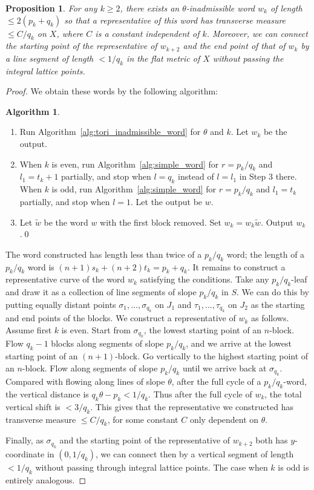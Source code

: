 \documentclass[11pt]{article} %
\theoremstyle{plain}
\newtheorem{prop}[thm]{Proposition}
\theoremstyle{definition}
\newtheorem{alg}[thm]{Algorithm}
\numberwithin{equation}{section}
\begin{document}
\begin{prop}
For any $k\ge2$, there exists an $\theta$-inadmissible word $w_{k}$ of length $\le 2(p_k+q_k)$ so that a representative of this word has transverse measure $\le C/q_{k}$ on $X$, where $C$ is a constant independent of $k$. Moreover, we can connect the starting point of the representative of $w_{k+2}$ and the end point of that of $w_k$ by a line segment of length $<1/q_k$ in the flat metric of $X$ without passing the integral lattice points. 
\end{prop}
\begin{proof}
We obtain these words by the following algorithm:
\begin{alg}\label{alg:tori_segments}
\begin{enumerate}[topsep=0mm, itemsep=0mm]
    \item Run Algorithm~\ref{alg:tori_inadmissible_word} for $\theta$ and $k$. Let $w_k$ be the output.
    \item When $k$ is even, run Algorithm~\ref{alg:simple_word} for $r=p_k/q_k$ and $l_1=t_k+1$ partially, and stop when $l=q_k$ instead of $l=l_1$ in Step 3 there. When $k$ is odd, run Algorithm~\ref{alg:simple_word} for $r=p_k/q_k$ and $l_1=t_k$ partially, and stop when $l=1$. Let the output be $w$.
    \item Let $\tilde w$ be the word $w$ with the first block removed. Set $w_k=w_k\tilde w$. Output $w_k$.\qed
\end{enumerate}
\end{alg}
The word constructed has length less than twice of a $p_k/q_k$ word; the length of a $p_k/q_k$ word is $(n+1)s_k+(n+2)t_k=p_k+q_k$. It remains to construct a representative curve of the word $w_k$ satisfying the conditions. Take any $p_k/q_k$-leaf and draw it as a collection of line segments of slope $p_k/q_k$ in $S$. We can do this by putting equally distant points $\sigma_1,\ldots,\sigma_{q_k}$ on $J_1$ and $\tau_1,\ldots,\tau_{q_k}$ on $J_2$ as the starting and end points of the blocks. We construct a representative of $w_k$ as follows. Assume first $k$ is even. Start from $\sigma_{q_k}$, the lowest starting point of an $n$-block. Flow $q_{k}-1$ blocks along segments of slope $p_k/q_k$, and we arrive at the lowest starting point of an $(n+1)$-block. Go vertically to the highest starting point of an $n$-block. Flow along segments of slope $p_k/q_k$ until we arrive back at $\sigma_{q_k}$. Compared with flowing along lines of slope $\theta$, after the full cycle of a $p_k/q_k$-word, the vertical distance is $q_k\theta-p_k<1/q_k$. Thus after the full cycle of $w_k$, the total vertical shift is $<3/q_k$. This gives that the representative we constructed has transverse measure $\le C/q_k$, for some constant $C$ only dependent on $\theta$.

Finally, as $\sigma_{q_k}$ and the starting point of the representative of $w_{k+2}$ both has $y$-coordinate in $(0,1/q_k)$, we can connect then by a vertical segment of length $<1/q_k$ without passing through integral lattice points. The case when $k$ is odd is entirely analogous.
\end{proof}
\end{document}
